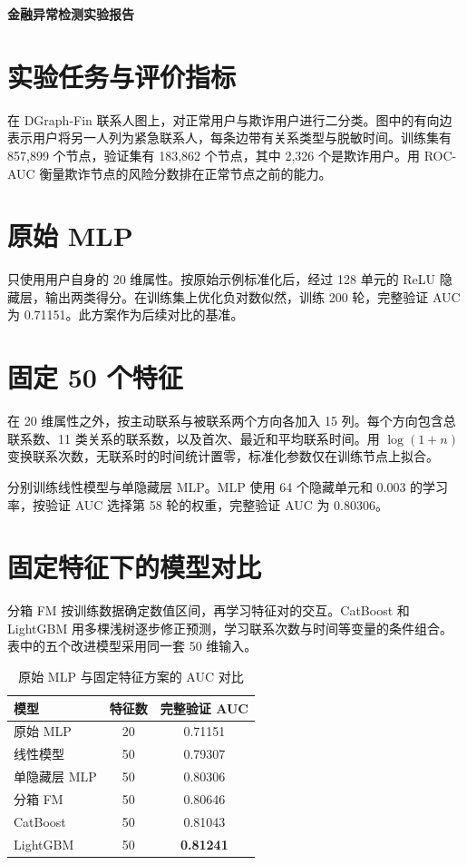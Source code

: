 \documentclass[UTF8,a4paper,zihao=-4,fontset=fandol]{ctexart}
\newcommand*{\ReportTitle}{金融异常检测实验报告}
\newcommand*{\ReportByline}{} %
\begin{document}
\begin{center}
  {\bfseries \ReportTitle\par}
  \ifdefempty{\ReportByline}{}{\medskip{\zihao{5}\ReportByline\par}}
\end{center}


\section{实验任务与评价指标}
在 DGraph-Fin 联系人图上，对正常用户与欺诈用户进行二分类。图中的有向边表示用户将另一人列为紧急联系人，每条边带有关系类型与脱敏时间。训练集有 857,899 个节点，验证集有 183,862 个节点，其中 2,326 个是欺诈用户。用 ROC-AUC 衡量欺诈节点的风险分数排在正常节点之前的能力。

\section{原始 MLP}
只使用用户自身的 20 维属性。按原始示例标准化后，经过 128 单元的 ReLU 隐藏层，输出两类得分。在训练集上优化负对数似然，训练 200 轮，完整验证 AUC 为 0.71151。此方案作为后续对比的基准。

\section{固定 50 个特征}
在 20 维属性之外，按主动联系与被联系两个方向各加入 15 列。每个方向包含总联系数、11 类关系的联系数，以及首次、最近和平均联系时间。用 $\log(1+n)$ 变换联系次数，无联系时的时间统计置零，标准化参数仅在训练节点上拟合。

分别训练线性模型与单隐藏层 MLP。MLP 使用 64 个隐藏单元和 0.003 的学习率，按验证 AUC 选择第 58 轮的权重，完整验证 AUC 为 0.80306。

\section{固定特征下的模型对比}
分箱 FM 按训练数据确定数值区间，再学习特征对的交互。CatBoost 和 LightGBM 用多棵浅树逐步修正预测，学习联系次数与时间等变量的条件组合。表中的五个改进模型采用同一套 50 维输入。

\begin{table}[H]
  \centering
  \caption{原始 MLP 与固定特征方案的 AUC 对比}
  \small
  \begin{tabular*}{\linewidth}{@{\extracolsep{\fill}}lcc@{}}
    \toprule
    模型 & 特征数 & 完整验证 AUC\\
    \midrule
    原始 MLP & 20 & 0.71151\\
    线性模型 & 50 & 0.79307\\
    单隐藏层 MLP & 50 & 0.80306\\
    分箱 FM & 50 & 0.80646\\
    CatBoost & 50 & 0.81043\\
    LightGBM & 50 & \textbf{0.81241}\\
    \bottomrule
  \end{tabular*}
\end{table}
\end{document}
